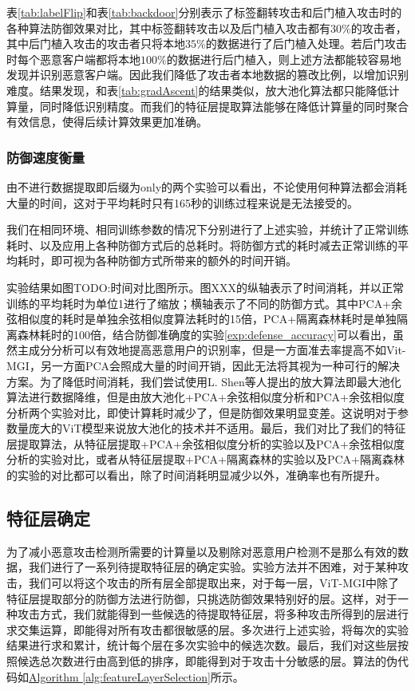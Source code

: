 \documentclass[conference]{IEEEtran}
\begin{document}
表\hyperref[tab:labelFlip]{\ref{tab:labelFlip}}和表\hyperref[tab:backdoor]{\ref{tab:backdoor}}分别表示了标签翻转攻击和后门植入攻击时的各种算法防御效果对比，其中标签翻转攻击以及后门植入攻击都有$30\%$的攻击者，其中后门植入攻击的攻击者只将本地$35\%$的数据进行了后门植入处理。若后门攻击时每个恶意客户端都将本地$100\%$的数据进行后门植入，则上述方法都能较容易地发现并识别恶意客户端。因此我们降低了攻击者本地数据的篡改比例，以增加识别难度。结果发现，和表\hyperref[tab:gradAscent]{\ref{tab:gradAscent}}的结果类似，放大池化算法都只能降低计算量，同时降低识别精度。而我们的特征层提取算法能够在降低计算量的同时聚合有效信息，使得后续计算效果更加准确。

\subsubsection{\textbf{防御速度衡量}}

由不进行数据提取即后缀为only的两个实验可以看出，不论使用何种算法都会消耗大量的时间，这对于平均耗时只有165秒的训练过程来说是无法接受的。

我们在相同环境、相同训练参数的情况下分别进行了上述实验，并统计了正常训练耗时、以及应用上各种防御方式后的总耗时。将防御方式的耗时减去正常训练的平均耗时，即可视为各种防御方式所带来的额外的时间开销。

实验结果如图TODO:时间对比图所示。图XXX的纵轴表示了时间消耗，并以正常训练的平均耗时为单位1进行了缩放；横轴表示了不同的防御方式。其中PCA+余弦相似度的耗时是单独余弦相似度算法耗时的15倍，PCA+隔离森林耗时是单独隔离森林耗时的100倍，结合防御准确度的实验\hyperref[exp:defense_accuracy]{\ref{exp:defense_accuracy}}可以看出，虽然主成分分析可以有效地提高恶意用户的识别率，但是一方面准去率提高不如Vit-MGI，另一方面PCA会照成大量的时间开销，因此无法将其视为一种可行的解决方案。为了降低时间消耗，我们尝试使用L. Shen等人提出的放大算法\cite{betterTogether}即最大池化算法进行数据降维，但是由放大池化+PCA+余弦相似度分析和PCA+余弦相似度分析两个实验对比，即使计算耗时减少了，但是防御效果明显变差。这说明对于参数量庞大的ViT模型来说放大池化的技术并不适用。最后，我们对比了我们的特征层提取算法，从特征层提取+PCA+余弦相似度分析的实验以及PCA+余弦相似度分析的实验对比，或者从特征层提取+PCA+隔离森林的实验以及PCA+隔离森林的实验的对比都可以看出，除了时间消耗明显减少以外，准确率也有所提升。

\subsection{特征层确定}
\label{exp:exp_layer}

为了减小恶意攻击检测所需要的计算量以及剔除对恶意用户检测不是那么有效的数据，我们进行了一系列待提取特征层的确定实验。实验方法并不困难，对于某种攻击，我们可以将这个攻击的所有层全部提取出来，对于每一层，ViT-MGI中除了特征层提取部分的防御方法进行防御，只挑选防御效果特别好的层。这样，对于一种攻击方式，我们就能得到一些候选的待提取特征层，将多种攻击所得到的层进行求交集运算，即能得对所有攻击都很敏感的层。多次进行上述实验，将每次的实验结果进行求和累计，统计每个层在多次实验中的候选次数。最后，我们对这些层按照候选总次数进行由高到低的排序，即能得到对于攻击十分敏感的层。算法的伪代码如\hyperref[alg:featureLayerSelection]{Algorithm \ref{alg:featureLayerSelection}}所示。
\end{document}
